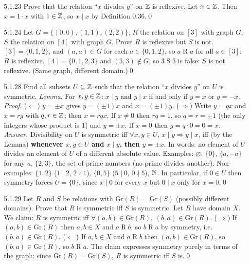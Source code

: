 \begin{bookex}[essential]{5.1.23}
Prove that the relation ``$x$ divides $y$'' on $\mathbb{Z}$ is reflexive.
\solution
Let $x\in\mathbb{Z}$. Then $x=1\cdot x$ with $1\in\mathbb{Z}$, so $x\mid x$ by Definition 0.36.\qed
\end{bookex}

\begin{bookex}[recommended]{5.1.24}
Let $G=\{(0,0),(1,1),(2,2)\}$, $R$ the relation on $[3]$ with graph $G$, $S$ the relation on $[4]$ with graph $G$. Prove $R$ is reflexive but $S$ is not.
\solution
$[3]=\{0,1,2\}$, and $(a,a)\in G$ for each $a\in\{0,1,2\}$, so $a\mathrel Ra$ for all $a\in[3]$: $R$ is reflexive. $[4]=\{0,1,2,3\}$ and $(3,3)\notin G$, so $3\mathrel S3$ is false: $S$ is not reflexive. (Same graph, different domain.)\qed
\end{bookex}

\begin{bookex}[essential]{5.1.28}
Find all subsets $U\subseteq\mathbb{Z}$ such that the relation ``$x$ divides $y$'' on $U$ is symmetric.
\solution
\emph{Lemma.} For $x,y\in\mathbb{Z}$: $x\mid y$ and $y\mid x$ if and only if $y=x$ or $y=-x$. \emph{Proof.} ($\Leftarrow$) $y=\pm x$ gives $y=(\pm1)x$ and $x=(\pm1)y$. ($\Rightarrow$) Write $y=qx$ and $x=ry$ with $q,r\in\mathbb{Z}$; then $x=rqx$. If $x\ne0$ then $rq=1$, so $q=r=\pm1$ (the only integers whose product is $1$) and $y=\pm x$. If $x=0$ then $y=q\cdot0=0=x$.\\
\emph{Answer.} Divisibility on $U$ is symmetric iff $\forall x,y\in U,\ x\mid y\Rightarrow y\mid x$, iff (by the Lemma) \textbf{whenever $x,y\in U$ and $x\mid y$, then $y=\pm x$}. In words: no element of $U$ divides an element of $U$ of a different absolute value. Examples: $\varnothing$, $\{0\}$, $\{a,-a\}$ for any $a$, $\{2,3\}$, the set of prime numbers (no prime divides another). Non-examples: $\{1,2\}$ ($1\mid2$, $2\nmid1$), $\{0,5\}$ ($5\mid0$, $0\nmid5$), $\mathbb{N}$. In particular, if $0\in U$ then symmetry forces $U=\{0\}$, since $x\mid0$ for every $x$ but $0\mid x$ only for $x=0$.\qed
\end{bookex}

\begin{bookex}[recommended]{5.1.29}
Let $R$ and $S$ be relations with $\mathrm{Gr}(R)=\mathrm{Gr}(S)$ (possibly different domains). Prove that $R$ is symmetric iff $S$ is symmetric.
\solution
Let $R$ have domain $X$. We claim: $R$ is symmetric iff $\forall(a,b)\in\mathrm{Gr}(R),\ (b,a)\in\mathrm{Gr}(R)$. ($\Rightarrow$) If $(a,b)\in\mathrm{Gr}(R)$ then $a,b\in X$ and $a\mathrel Rb$, so $b\mathrel Ra$ by symmetry, i.e.\ $(b,a)\in\mathrm{Gr}(R)$. ($\Leftarrow$) If $a,b\in X$ and $a\mathrel Rb$ then $(a,b)\in\mathrm{Gr}(R)$, so $(b,a)\in\mathrm{Gr}(R)$, so $b\mathrel Ra$. The claim expresses symmetry purely in terms of the graph; since $\mathrm{Gr}(R)=\mathrm{Gr}(S)$, $R$ is symmetric iff $S$ is.\qed
\end{bookex}

